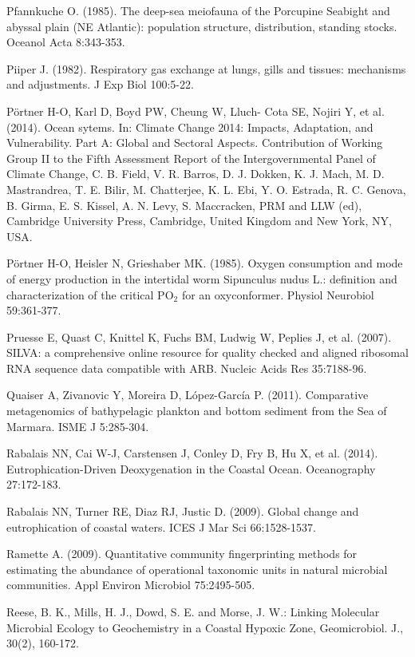 Pfannkuche O. (1985). The deep-sea meiofauna of the Porcupine Seabight and abyssal plain (NE Atlantic): population structure, distribution, standing stocks. Oceanol Acta 8:343-353.

Piiper J. (1982). Respiratory gas exchange at lungs, gills and tissues: mechanisms and adjustments. J Exp Biol 100:5-22.

P\"ortner H-O, Karl D, Boyd PW, Cheung W, Lluch- Cota SE, Nojiri Y, et al. (2014). Ocean sytems. In: Climate Change 2014: Impacts, Adaptation, and Vulnerability. Part A: Global and Sectoral Aspects. Contribution of Working Group II to the Fifth Assessment Report of the Intergovernmental Panel of Climate Change, C. B. Field, V. R. Barros, D. J. Dokken, K. J. Mach, M. D. Mastrandrea, T. E. Bilir, M. Chatterjee, K. L. Ebi, Y. O. Estrada, R. C. Genova, B. Girma, E. S. Kissel, A. N. Levy, S. Maccracken, PRM and LLW (ed), Cambridge University Press, Cambridge, United Kingdom and New York, NY, USA.

P\"ortner H-O, Heisler N, Grieshaber MK. (1985). Oxygen consumption and mode of energy production in the intertidal worm Sipunculus nudus L.: definition and characterization of the critical PO$_2$ for an oxyconformer. Physiol Neurobiol 59:361-377.

Pruesse E, Quast C, Knittel K, Fuchs BM, Ludwig W, Peplies J, et al. (2007). SILVA: a comprehensive online resource for quality checked and aligned ribosomal RNA sequence data compatible with ARB. Nucleic Acids Res 35:7188-96.

Quaiser A, Zivanovic Y, Moreira D, López-García P. (2011). Comparative metagenomics of bathypelagic plankton and bottom sediment from the Sea of Marmara. ISME J 5:285-304.

Rabalais NN, Cai W-J, Carstensen J, Conley D, Fry B, Hu X, et al. (2014). Eutrophication-Driven Deoxygenation in the Coastal Ocean. Oceanography 27:172-183.

Rabalais NN, Turner RE, Diaz RJ, Justic D. (2009). Global change and eutrophication of coastal waters. ICES J Mar Sci 66:1528-1537.

Ramette A. (2009). Quantitative community fingerprinting methods for estimating the abundance of operational taxonomic units in natural microbial communities. Appl Environ Microbiol 75:2495-505.

Reese, B. K., Mills, H. J., Dowd, S. E. and Morse, J. W.: Linking Molecular Microbial Ecology to Geochemistry in a Coastal Hypoxic Zone, Geomicrobiol. J., 30(2), 160-172.

